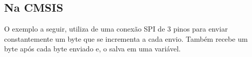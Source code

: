 

\subsection{Na CMSIS}
O exemplo a seguir, utiliza de uma conexão SPI de 3 pinos para enviar constantemente um byte que se incrementa a cada envio. Também recebe um byte após cada byte enviado e, o salva em uma variável.


